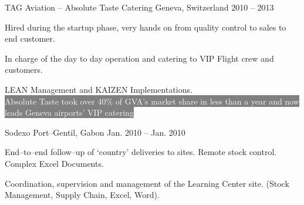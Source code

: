\begin{cventries}



{TAG Aviation – Absolute Taste Catering} %
{Geneva, Switzerland} %
{2010 – 2013} %
{\begin{cvitems}
\item {Hired during the startup phase, very hands on from quality control to sales to end customer.}
\item {In charge of the day to day operation and catering to VIP Flight crew and customers.}
\item {LEAN Management and KAIZEN Implementations.}
\\
\center\colorbox{gray}{\textcolor{white}{Absolute Taste took over 40\% of GVA’s market share in less than a year and now leads Geneva airports’ VIP catering}}
\end{cvitems}
}

{Sodexo} %
{Port–Gentil, Gabon} %
{Jan. 2010 – Jan. 2010} %
{\begin{cvitems}
\item {End–to–end follow–up of ‘country’ deliveries to sites. Remote stock control. Complex Excel Documents.}
\item {Coordination, supervision and management of the Learning Center site. (Stock Management, Supply Chain, Excel, Word).}
\end{cvitems}
}


\end{cventries}
